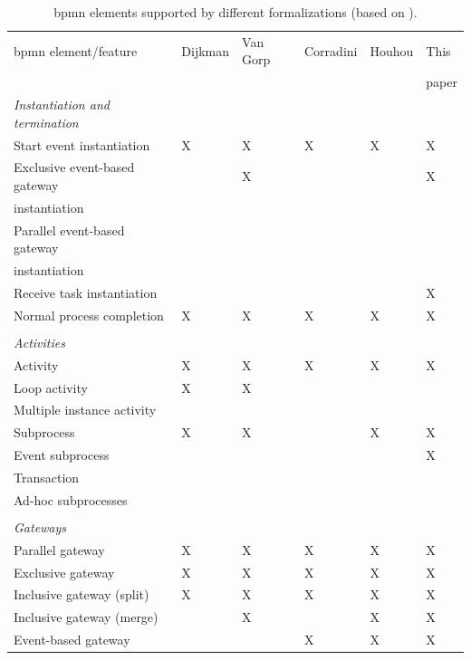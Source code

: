 \documentclass{lmcs} %
\theoremstyle{plain}\newtheorem{satz}[thm]{Satz} %
\begin{document}
\begin{table}[htbp]
    \caption{\gls*{bpmn} elements supported by different formalizations (based on \cite{vangorpVisualTokenbasedFormalization2013}).}
    \label{tab:supportedelements}
    \begin{threeparttable}
    \begin{tabular}{l l l l l l}
    \hline
      \gls*{bpmn} element/feature & Dijkman & Van Gorp &  Corradini & Houhou & This\\
      & \cite{dijkmanSemanticsAnalysisBusiness2008} & \cite{vangorpVisualTokenbasedFormalization2013} & \cite{corradiniFormalApproachAnalysis2021}&  \cite{houhouFirstOrderLogicVerification2022} & paper\\
      \hline
      \textit{Instantiation and termination}\\
      Start event instantiation & X & X & X & X & X\\
      Exclusive event-based gateway & & X & & & X \\
        \quad instantiation \\
      Parallel event-based gateway & & & & & \\
        \quad instantiation \\
      Receive task instantiation & & & & & X\\
      Normal process completion & X & X & X & X & X\\
      \\
      \textit{Activities}\\
      Activity & X & X & X & X & X\\
      Loop activity & X & X & & &\\
      Multiple instance activity & & & & & \\
      Subprocess & X & X & & X & X\\
      Event subprocess & &  &  &  & X\\
      Transaction & &  &  &  & \\
      Ad-hoc subprocesses & & & & &\\
      \\
      \textit{Gateways}\\
      Parallel gateway & X & X & X & X & X\\
      Exclusive gateway & X & X & X & X & X\\
      Inclusive gateway (split) & X & X & X & X & X\\
      Inclusive gateway (merge) & & X & & X & X\\
      Event-based gateway & & & X\tnote{1} & X & X\\ %

\end{tabular}
\end{threeparttable}
\end{table}
\end{document}
